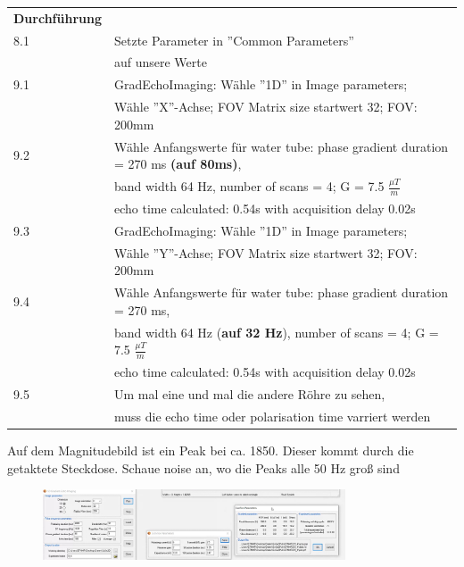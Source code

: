 \begin{tabular}{ll}
    \textbf{Durchführung} & \\

    8.1 & Setzte Parameter in ''Common Parameters''  \\

        &  auf unsere Werte \\

    9.1 & GradEchoImaging: Wähle  ''1D'' in Image parameters;  \\

        & Wähle ''X''-Achse; FOV Matrix size startwert 32; FOV: 200mm \\

    9.2 & Wähle Anfangswerte für water tube: phase gradient duration = 270 ms \textbf{(auf 80ms)},  \\

        & band width 64 Hz, number of scans = 4; G = 7.5 $\frac{\mu T}{m}$ \\

        & echo time calculated: 0.54s with acquisition delay 0.02s \\

    9.3 & GradEchoImaging: Wähle  ''1D'' in Image parameters;  \\

        & Wähle ''Y''-Achse; FOV Matrix size startwert 32; FOV: 200mm \\

    9.4 & Wähle Anfangswerte für water tube: phase gradient duration = 270 ms,  \\

        & band width 64 Hz (\textbf{auf 32 Hz}), number of scans = 4; G = 7.5 $\frac{\mu T}{m}$ \\

        & echo time calculated: 0.54s with acquisition delay 0.02s \\

    9.5 &  Um mal eine und mal die andere Röhre zu sehen, \\
    & muss die echo time oder polarisation time varriert werden \\

\end{tabular}  

Auf dem Magnitudebild ist ein Peak bei ca. 1850. Dieser kommt durch die getaktete Steckdose. 
Schaue noise an, wo die Peaks alle 50 Hz groß sind

\begin{figure}[H]
    \centering
    \includegraphics[width = 0.8\textwidth]{Screenshot2/9_2Messwerte.jpg}
\end{figure}

